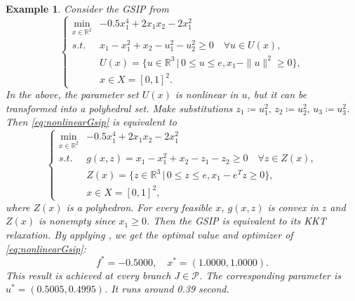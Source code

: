 \documentclass{amsart}
\theoremstyle{plain}
\newtheorem{exmp}[theorem]{Example}
\newcommand{\re}{\mathbb{R}}
\newcommand{\st}{\mathit{s.t.}}
\newcommand{\mc}[1]{\mathcal{#1}}
\numberwithin{equation}{section}
\begin{document}
		\begin{exmp} 
			Consider the GSIP from \cite{articleAngelos2015,ruckmann2001second} 
			\begin{equation}\label{eq:nonlinearGsip}
				\left\{\begin{array}{cl}
					\min\limits_{x\in\re^2} & -0.5x_1^4+2x_1x_2-2x_1^2\\
					\st & x_1-x_1^2+x_2-u_1^2-u_2^2\ge 0\quad \forall u\in U(x),\\
					& U(x) = \{u\in\re^3\,\vert\, 0\le u\le e, x_1-\|u\|^2\ge 0\},\\
					& x\in X = [0,1]^2.
				\end{array}
				\right.
			\end{equation}
			In the above, the parameter set $U(x)$ is nonlinear in $u$, 
			but it can be transformed into a polyhedral set. 
			Make substitutions $z_1\coloneqq u_1^2,\, z_2\coloneqq u_2^2,\, u_3\coloneqq u_3^2$. Then \eqref{eq:nonlinearGsip} is equivalent
			to 
			\[
			\left\{\begin{array}{cl}
				\min\limits_{x\in\re^2} & -0.5x_1^4+2x_1x_2-2x_1^2\\
				\st & g(x,z) = x_1-x_1^2+x_2-z_1-z_2\ge 0\quad \forall z\in Z(x), \\
				& Z(x) = \{z\in\re^3\,\vert\, 0\le z\le e, x_1-e^Tz\ge 0\},\\
				& x\in X = [0,1]^2,
			\end{array}
			\right.
			\]
			where $Z(x)$ is a polyhedron.
			For every feasible $x$, $g(x,z)$ is convex in $z$
			and $Z(x)$ is nonempty since $x_1\ge 0$.
			Then the GSIP is equivalent to its KKT relaxation.
			By applying , we get the optimal value and optimizer of \eqref{eq:nonlinearGsip}:
			\[
			f^* = -0.5000, \quad x^* = (1.0000, 1.0000).
			\]
			This result is achieved at every branch $J\in\mc{P}$.
			The corresponding parameter is $u^* = (0.5005, 0.4995)$.
			It runs around 0.39 second. 			
		\end{exmp}
		
\end{document}
